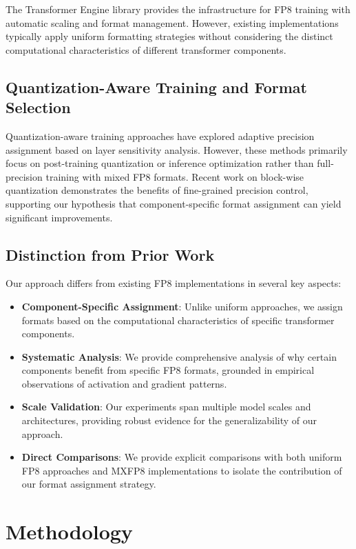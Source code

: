 \documentclass[conference]{IEEEtran}
\begin{document}
The Transformer Engine library \cite{TE2025} provides the infrastructure for FP8 training with automatic scaling and format management. However, existing implementations typically apply uniform formatting strategies without considering the distinct computational characteristics of different transformer components.

\subsection{Quantization-Aware Training and Format Selection}

Quantization-aware training approaches \cite{jacob2018quantization} have explored adaptive precision assignment based on layer sensitivity analysis. However, these methods primarily focus on post-training quantization or inference optimization rather than full-precision training with mixed FP8 formats. Recent work on block-wise quantization \cite{dettmers2022gpt3} demonstrates the benefits of fine-grained precision control, supporting our hypothesis that component-specific format assignment can yield significant improvements.

\subsection{Distinction from Prior Work}

Our approach differs from existing FP8 implementations in several key aspects:

\begin{itemize}
\item \textbf{Component-Specific Assignment}: Unlike uniform approaches, we assign formats based on the computational characteristics of specific transformer components.
\item \textbf{Systematic Analysis}: We provide comprehensive analysis of why certain components benefit from specific FP8 formats, grounded in empirical observations of activation and gradient patterns.
\item \textbf{Scale Validation}: Our experiments span multiple model scales and architectures, providing robust evidence for the generalizability of our approach.
\item \textbf{Direct Comparisons}: We provide explicit comparisons with both uniform FP8 approaches and MXFP8 implementations to isolate the contribution of our format assignment strategy.
\end{itemize}

\section{Methodology}
\label{sec:methodology}
\end{document}
